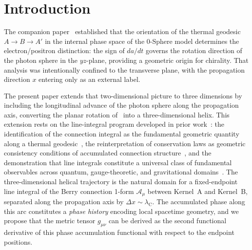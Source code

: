 \documentclass[%
 reprint, amsmath,amssymb, aps, prb, ]{revtex4-2}
\numberwithin{equation}{section}
\newcommand{\lambdaC}{\lambda_{\mathrm{C}}}
\begin{document}
\section{Introduction}
\label{sec:intro}

The companion paper~\cite{hanamura50} established that the orientation of the thermal geodesic~\cite{hanamura24} $A\to B\to A'$ in the internal phase space of the 0-Sphere model determines the electron/positron distinction: the sign of $da/dt$ governs the rotation direction of the photon sphere in the $yz$-plane, providing a geometric origin for chirality. That analysis was intentionally confined to the transverse plane, with the propagation direction $x$ entering only as an external label.

The present paper extends that two-dimensional picture to three dimensions by including the longitudinal advance of the photon sphere along the propagation axis, converting the planar rotation of~\cite{hanamura50} into a three-dimensional helix. This extension rests on the line-integral program developed in prior work~\cite{hanamura29, hanamura30, hanamura31}: the identification of the connection integral as the fundamental geometric quantity along a thermal geodesic~\cite{hanamura29}, the reinterpretation of conservation laws as geometric consistency conditions of accumulated connection structure~\cite{hanamura30}, and the demonstration that line integrals constitute a universal class of fundamental observables across quantum, gauge-theoretic, and gravitational domains~\cite{hanamura31}. The three-dimensional helical trajectory is the natural domain for a fixed-endpoint line integral of the Berry connection 1-form $\mathcal{A}_\mu$ between Kernel~A and Kernel~B, separated along the propagation axis by $\Delta x\sim\lambdaC$. The accumulated phase along this arc constitutes a \emph{phase history} encoding local spacetime geometry, and we propose that the metric tensor $g_{\mu\nu}$ can be derived as the second functional derivative of this phase accumulation functional with respect to the endpoint positions.
\end{document}
